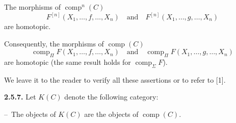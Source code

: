The morphisms of $\operatorname{comp}^{n}(C)$
\begin{equation*}
  F^{[n]}(X_1,\ldots,f,\ldots,X_n)
  \quad\text{and}\quad
  F^{[n]}(X_1,\ldots,g,\ldots,X_n)
\end{equation*}
are homotopic.

Consequently, the morphisms of $\operatorname{comp}(C)$
\begin{equation*}
  \operatorname{comp}_{\Pi}F(X_1,\ldots,f,\ldots,X_n)
  \quad\text{and}\quad
  \operatorname{comp}_{\Pi}F(X_1,\ldots,g,\ldots,X_n)
\end{equation*}
are homotopic (the same result holds for
$\operatorname{comp}_{\Sigma}F$).

We leave it to the reader to verify all these assertions or to refer to [1].

\noindent\textbf{2.5.7.}\quad
Let $K(C)$ denote the following category:

\noindent\hspace*{2em}--\ The objects of $K(C)$ are the objects of $\operatorname{comp}(C)$.
